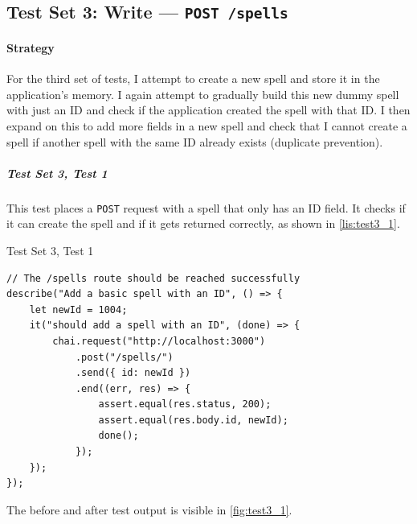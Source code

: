 \subsection{Test Set 3: Write --- \texttt{POST /spells}}
\paragraph{Strategy} For the third set of tests, I attempt to create a new spell and store it in the application's memory. I again attempt to gradually build this new dummy spell with just an ID and check if the application created the spell with that ID. I then expand on this to add more fields in a new spell and check that I cannot create a spell if another spell with the same ID already exists (duplicate prevention).

\subparagraph{Test Set 3, Test 1} This test places a \texttt{POST} request with a spell that only has an ID field. It checks if it can create the spell and if it gets returned correctly, as shown in \autoref{lis:test3_1}.

\begin{listing}[h]
\caption{Test Set 3, Test 1}
\label{lis:test3_1}

\begin{verbatim}
// The /spells route should be reached successfully
describe("Add a basic spell with an ID", () => {
	let newId = 1004;
	it("should add a spell with an ID", (done) => {
		chai.request("http://localhost:3000")
			.post("/spells/")
			.send({ id: newId })
			.end((err, res) => {
				assert.equal(res.status, 200);
				assert.equal(res.body.id, newId);
				done();
			});
	});
});
\end{verbatim}
\end{listing}

The before and after test output is visible in \autoref{fig:test3_1}.

